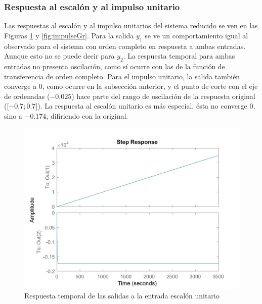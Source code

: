 \documentclass[journal]{IEEEtran}
\begin{document}
\subsubsection*{Respuesta al escalón y al impulso unitario}
Las respuestas al escalón y al impulso unitarios del sistema reducido se ven en las Figuras \ref{fig:stepGr} y \ref{fig:impulseGr}. Para la salida $y_1$ se ve un comportamiento igual al observado para el sistema con orden completo en respuesta a ambas entradas. Aunque esto no se puede decir para $y_2$. La respuesta temporal para ambas entradas no presenta oscilación, como sí ocurre con las de la función de transferencia de orden completo. Para el impulso unitario, la salida también converge a 0, como ocurre en la subsección anterior, y el punto de corte con el eje de ordenadas ($-0.025$) hace parte del rango de oscilación de la respuesta original ([$-0.7;0.7$]). La respuesta al escalón unitario es más especial, ésta no converge 0, sino a $-0.174$, difiriendo con la original. 

\begin{figure}[ht!]
\caption{Respuesta temporal de las salidas a la entrada escalón unitario\label{fig:stepGr}}
  \centering
\includegraphics[scale=0.18]{tf/step_Gr.jpg}
\end{figure}
\end{document}
